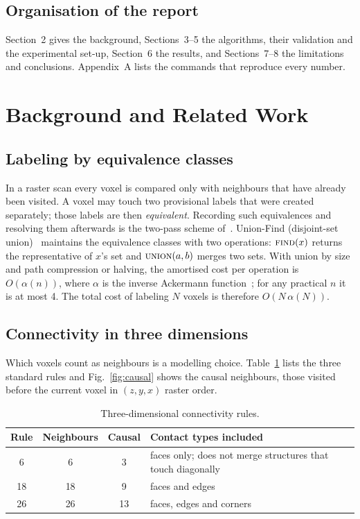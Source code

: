 \documentclass[11pt,a4paper]{article}
\newcommand{\hrow}{\rowcolor{sitlight}}
\begin{document}
\subsection{Organisation of the report}
Section~2 gives the background, Sections~3--5 the algorithms, their validation and the experimental set-up, Section~6 the results, and Sections~7--8 the limitations and conclusions. Appendix~A lists the commands that reproduce every number.

\section{Background and Related Work}
\subsection{Labeling by equivalence classes}
In a raster scan every voxel is compared only with neighbours that have already been visited. A voxel may touch two provisional labels that were created separately; those labels are then \emph{equivalent}. Recording such equivalences and resolving them afterwards is the two-pass scheme of~\cite{rosenfeld1966}. Union-Find (disjoint-set union)~\cite{galler1964} maintains the equivalence classes with two operations: $\textsc{find}(x)$ returns the representative of $x$'s set and $\textsc{union}(a,b)$ merges two sets. With union by size and path compression or halving, the amortised cost per operation is $O(\alpha(n))$, where $\alpha$ is the inverse Ackermann function~\cite{tarjan1975,tarjan1984}; for any practical $n$ it is at most 4. The total cost of labeling $N$ voxels is therefore $O(N\,\alpha(N))$.

\subsection{Connectivity in three dimensions}
Which voxels count as neighbours is a modelling choice. Table~\ref{tab:conn} lists the three standard rules and Fig.~\ref{fig:causal} shows the causal neighbours, those visited before the current voxel in $(z,y,x)$ raster order.

\begin{table}[!t]
\centering
\caption{Three-dimensional connectivity rules.}\label{tab:conn}
\small
\begin{tabular}{@{}cccp{8.2cm}@{}}
\toprule
\hrow Rule & Neighbours & Causal & Contact types included\\
\midrule
6  & 6  & 3  & faces only; does not merge structures that touch diagonally\\
18 & 18 & 9  & faces and edges\\
26 & 26 & 13 & faces, edges and corners\\
\bottomrule
\end{tabular}
\end{table}
\end{document}
